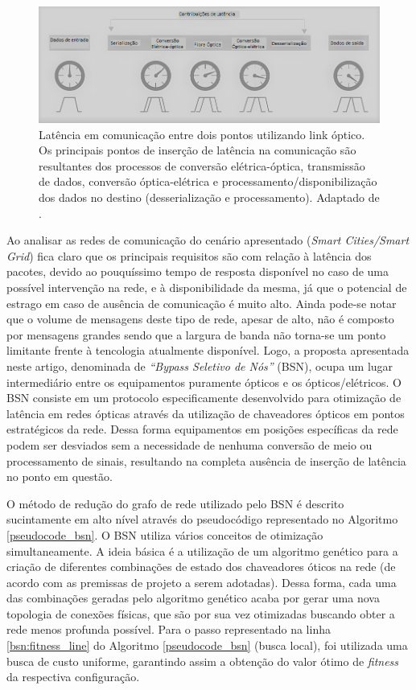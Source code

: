 \documentclass[12pt]{article}
\begin{document}
\begin{figure} %
	\centering
	\includegraphics[width=12cm]{latency_link}
	\caption{Latência em comunicação entre dois pontos utilizando link óptico. Os principais pontos de inserção de latência na comunicação são resultantes dos processos de conversão elétrica-óptica, transmissão de dados, conversão óptica-elétrica e processamento/disponibilização dos dados no destino (desserialização e processamento). Adaptado de \cite{Art_Coffey}.}
	\label{fig_latency_link}
\end{figure}

Ao analisar as redes de comunicação do cenário apresentado (\emph{Smart Cities/Smart Grid}) fica claro que os principais requisitos são com relação à latência dos pacotes, devido ao pouquíssimo tempo de resposta disponível no caso de uma possível intervenção na rede, e à disponibilidade da mesma, já que o potencial de estrago em caso de ausência de comunicação é muito alto. Ainda pode-se notar que o volume de mensagens deste tipo de rede, apesar de alto, não é composto por mensagens grandes sendo que a largura de banda não torna-se um ponto limitante frente à tencologia atualmente disponível. Logo, a proposta apresentada neste artigo, denominada de \emph{``Bypass Seletivo de Nós''} (BSN), ocupa um lugar intermediário entre os equipamentos puramente ópticos e os ópticos/elétricos. O BSN consiste em um protocolo especificamente desenvolvido para otimização de latência em redes ópticas através da utilização de chaveadores ópticos em pontos estratégicos da rede. Dessa forma equipamentos em posições específicas da rede podem ser desviados sem a necessidade de nenhuma conversão de meio ou processamento de sinais, resultando na completa ausência de inserção de latência no ponto em questão. 

O método de redução do grafo de rede utilizado pelo BSN é descrito sucintamente em alto nível através do pseudocódigo representado no Algoritmo \ref{pseudocode_bsn}. O BSN utiliza vários conceitos de otimização simultaneamente. A ideia básica é a utilização de um algoritmo genético para a criação de diferentes combinações de estado dos chaveadores óticos na rede (de acordo com as premissas de projeto a serem adotadas). Dessa forma, cada uma das combinações geradas pelo algoritmo genético acaba por gerar uma nova topologia de conexões físicas, que são por sua vez otimizadas buscando obter a rede menos profunda possível. Para o passo representado na linha \ref{bsn:fitness_line} do Algoritmo \ref{pseudocode_bsn} (busca local), foi utilizada uma busca de custo uniforme, garantindo assim a obtenção do valor ótimo de \emph{fitness} da respectiva configuração.
\end{document}
